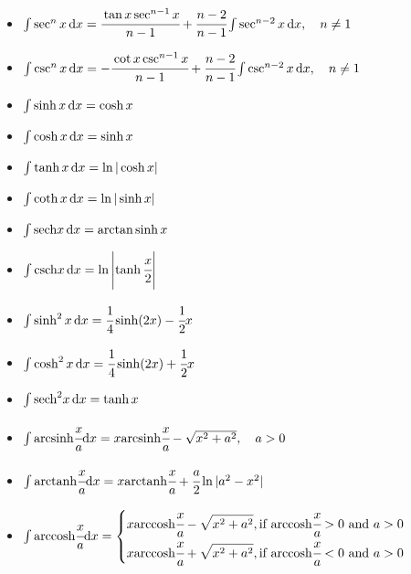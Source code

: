 \begin{itemize}
\item $ \int \sec^n x \, { { \text{d} } x} = \cfrac{\tan x\sec^{n-1} x}{n - 1} + \cfrac{n-2}{n-1}\int \sec^{n-2} x \, { { \text{d} } x},\quad n \neq 1$
\item $ \int \csc^n x \, { { \text{d} } x} = -\cfrac{\cot x\csc^{n-1} x}{n - 1} + \cfrac{n-2}{n-1}\int \csc^{n-2} x \, { { \text{d} } x},\quad n \neq 1$
\item $ \int \sinh x \, { { \text{d} } x} = \cosh x$
\item $ \int \cosh x \, { { \text{d} } x} = \sinh x$
\item $ \int \tanh x \, { { \text{d} } x} = \ln \vert \cosh x \vert$
\item $ \int \coth x \, { { \text{d} } x} = \ln \vert \sinh x \vert$
\item $ \int { \mathop{\text{sech}} } x \, { { \text{d} } x} = { \mathop{\text{arctan}} } \sinh x $
\item $ \int { \mathop{\text{csch}} } x \, { { \text{d} } x} = \ln\left\vert\tanh \cfrac{x}{2} \right\vert$
\item $ \int \sinh^2 x \, { { \text{d} } x} = \cfrac{1}{4} \sinh (2x) - \cfrac{1}{2} x$
\item $ \int \cosh^2 x \, { { \text{d} } x} = \cfrac{1}{4} \sinh (2x) + \cfrac{1}{2} x$
\item $ \int { \mathop{\text{sech}} }^2 x \, { { \text{d} } x} = \tanh x$
\item $ \int { \mathop{\text{arcsinh}} } \cfrac{x}{a} { { \text{d} } x} = x { \mathop{\text{arcsinh}} } \cfrac{x}{a} - \sqrt{x^2 + a^2},\quad a > 0$
\item $ \int { \mathop{\text{arctanh}} } \cfrac{x}{a} { { \text{d} } x} = x { \mathop{\text{arctanh}} } \cfrac{x}{a} + \cfrac{a}{2} \ln\vert a^2 - x^2\vert$
\item $ \int { \mathop{\text{arccosh}} } \cfrac{x}{a} { { \text{d} } x} = 
  \begin{cases}
  \displaystyle x { \mathop{\text{arccosh}} } \cfrac{x}{a} - \sqrt{x^2 + a^2}, \text{if ${ \mathop{\text{arccosh}} } \cfrac{x}{a} > 0$ and $a > 0$} \\
  \displaystyle x { \mathop{\text{arccosh}} } \cfrac{x}{a} + \sqrt{x^2 + a^2}, \text{if ${ \mathop{\text{arccosh}} } \cfrac{x}{a} < 0$ and $a > 0$}
  \end{cases} $


\end{itemize}
